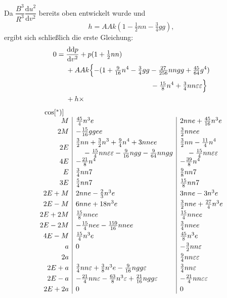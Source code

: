 \begingroup
{}
\renewcommand{\headrulewidth}{0pt}
\par\noindent Da \(\dfrac{B^3}{R^3}\dfrac{\mathrm du^2}{\mathrm dv^2}\) bereits oben entwickelt wurde und
\[
h=AAk(1-\tfrac12nn-\tfrac34gg),
\]
\noindent ergibt sich schließlich die erste Gleichung:
\[
\begin{aligned}
0={}&\frac{\mathrm d\mathrm dp}{\mathrm dv^2}+p(1+\tfrac12nn)\\
&+AAk\Bigl\{-(1+\tfrac{9}{16}n^4-\tfrac34gg-\tfrac{27}{256}nngg+\tfrac{45}{64}g^4)\\
&\hspace{42mm}-\tfrac{15}{8}n^4+\tfrac34nn\varepsilon\varepsilon\Bigr\}\\
&+h\times
\end{aligned}
\]
\[
\begin{array}{r|l|l}
\multicolumn{1}{c}{\cos[{}^{*})]}&\multicolumn{1}{c}{}&\\
M&\tfrac{45}{4}n^3e&2nne+\tfrac{45}{16}n^3e\\[3pt]
2M&-\tfrac{15}{16}ggee&\tfrac32nnee\\[3pt]
2E&\begin{aligned}
&\tfrac32nn+\tfrac32n^3+\tfrac94n^4+3nnee\\
&\quad-\tfrac{15}{4}nn\varepsilon\varepsilon-\tfrac{9}{16}ngg-\tfrac{9}{64}nngg
\end{aligned}&
\begin{aligned}
&\tfrac32nn-\tfrac{11}{4}n^4\\
&\quad-\tfrac{15}{4}nn\varepsilon\varepsilon
\end{aligned}\\[3pt]
4E&-\tfrac{21}{8}n^4&-\tfrac{39}{8}n^4\\[3pt]
E&\tfrac34nn7&\tfrac98nn7\\[3pt]
3E&\tfrac54nn7&\tfrac{15}{8}nn7\\[3pt]
2E+M&2nne-\tfrac23n^3e&3nne-3n^3e\\[3pt]
2E-M&6nne+18n^3e&\tfrac32nne+\tfrac{27}{4}n^3e\\[3pt]
2E+2M&\tfrac{15}{8}nnee&\tfrac{15}{4}nnee\\[3pt]
2E-2M&-\tfrac{15}{4}nee-\tfrac{159}{16}nnee&\tfrac34nnee\\[3pt]
4E-M&\tfrac{15}{4}n^3e&\tfrac{45}{8}n^3e\\[3pt]
a&0&-\tfrac32nn\varepsilon\\[3pt]
2a&&\tfrac94nn\varepsilon\varepsilon\\[3pt]
2E+a&\tfrac34nn\varepsilon+\tfrac38n^3e-\tfrac{9}{16}ngg\varepsilon&\tfrac34nn\varepsilon\\[3pt]
2E-a&-\tfrac{21}{4}nn\varepsilon-\tfrac{63}{8}n^3\varepsilon+\tfrac{21}{16}ngg\varepsilon&-\tfrac{21}{4}nn\varepsilon\varepsilon\\[3pt]
2E+2a&0&0
\end{array}
\]
